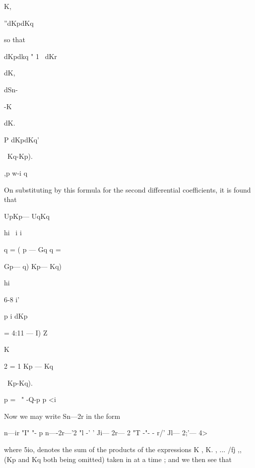 {K,



''dKpdKq



so that



dKpdkq " 1 ~dKr



dK,

dSn-



-K



dK.



P dKpdKq'



\ Kq-Kp).



,p w-i q

On substituting by this formula for the second differential
coefficients, it is found that






UpKp— UqKq



hi \ i i

  q = ( p — Gq q = \ \ {Gp— q) Kp— Kq)\



hi

6-8 i'



p i dKp



= 4:11 — I) Z



K



2 = 1 Kp — Kq\









\ Kp-Kq).



p = \ " -Q-p p <i

Now we may write Sn—2r in the form

 n—ir "I" "- p n—-2r—'2 "l -' ' Ji— 2r— 2 "T -"- - r/' Jl— 2;'— 4>

where 5io, denotes the sum of the products of the expressions K , K. ,
... /fj ,, (Kp and Kq both being omitted) taken in at a time ; and we
then see that






}}

